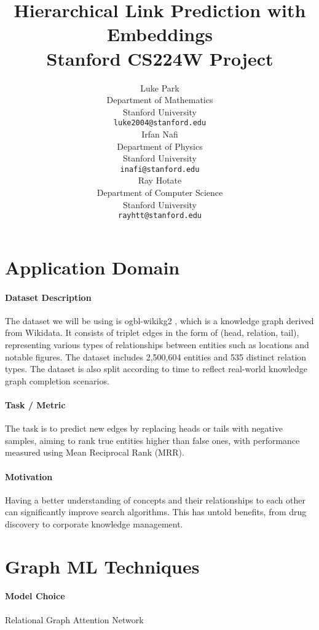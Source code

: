 \documentclass{article}
\title{
  Hierarchical Link Prediction with Embeddings \\
  \vspace{1em}
  \small{\normalfont Stanford CS224W Project}  %
}
\author{
  Luke Park \\
  Department of Mathematics \\
  Stanford University \\
  \texttt{luke2004@stanford.edu} \\
   \And
   Irfan Nafi \\
   Department of Physics \\
   Stanford University \\
   \texttt{inafi@stanford.edu} \\
   \And
   Ray Hotate \\
   Department of Computer Science \\
   Stanford University \\
   \texttt{rayhtt@stanford.edu}
}
\begin{document}
\maketitle

\section{Application Domain}

\paragraph{Dataset Description} 

The dataset we will be using is ogbl-wikikg2 \cite{ogblwikikg2dataset}, which is a knowledge graph derived from Wikidata. It consists of triplet edges in the form of (head, relation, tail), representing various types of relationships between entities such as locations and notable figures. The dataset includes 2,500,604 entities and 535 distinct relation types. The dataset is also split according to time to reflect real-world knowledge graph completion scenarios.

\paragraph{Task / Metric}

The task is to predict new edges by replacing heads or tails with negative samples, aiming to rank true entities higher than false ones, with performance measured using Mean Reciprocal Rank (MRR). 

\paragraph{Motivation}

Having a better understanding of concepts and their relationships to each other can significantly improve search algorithms. This has untold benefits, from drug discovery to corporate knowledge management.

\section{Graph ML Techniques}

\paragraph{Model Choice} 

Relational Graph Attention Network
\end{document}
